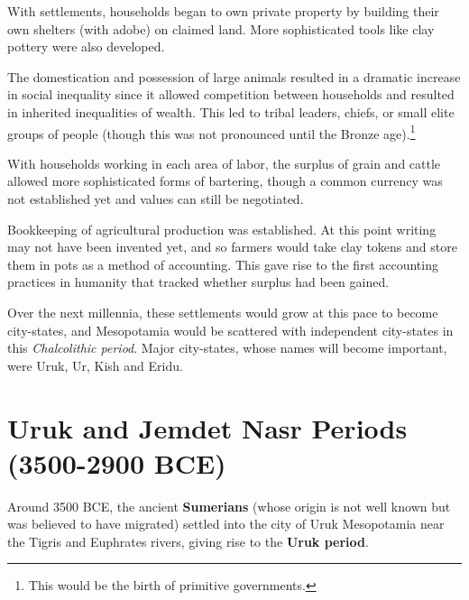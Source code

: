 \documentclass{article}
\begin{document}
    \begin{finance}
      With settlements, households began to own private property by building their own shelters (with adobe) on claimed land. More sophisticated tools like clay pottery were also developed. 
    \end{finance}

    \begin{finance}
      The domestication and possession of large animals resulted in a dramatic increase in social inequality since it allowed competition between households and resulted in inherited inequalities of wealth. This led to tribal leaders, chiefs, or small elite groups of people (though this was not pronounced until the Bronze age).\footnote{This would be the birth of primitive governments.} 
    \end{finance}

    \begin{finance}
      With households working in each area of labor, the surplus of grain and cattle allowed more sophisticated forms of bartering, though a common currency was not established yet and values can still be negotiated. 
    \end{finance}

    \begin{finance}
      Bookkeeping of agricultural production was established. At this point writing may not have been invented yet, and so farmers would take clay tokens and store them in pots as a method of accounting. This gave rise to the first accounting practices in humanity that tracked whether surplus had been gained. 
    \end{finance}

    Over the next millennia, these settlements would grow at this pace to become city-states, and Mesopotamia would be scattered with independent city-states in this \textit{Chalcolithic period}. Major city-states, whose names will become important, were Uruk, Ur, Kish and Eridu. 

\section{Uruk and Jemdet Nasr Periods (3500-2900 BCE)}

    Around 3500 BCE, the ancient \textbf{Sumerians} (whose origin is not well known but was believed to have migrated) settled into the city of Uruk Mesopotamia near the Tigris and Euphrates rivers, giving rise to the \textbf{Uruk period}. 
\end{document}
